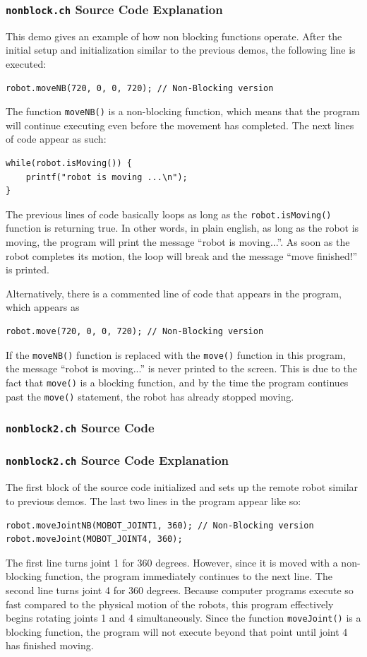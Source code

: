 \documentclass{article}
\begin{document}
\subsubsection{\texttt{nonblock.ch} Source Code Explanation}
This demo gives an example of how non blocking functions operate. 
After the initial setup and initialization similar to the previous
demos, the following line is executed:
\begin{verbatim}
robot.moveNB(720, 0, 0, 720); // Non-Blocking version
\end{verbatim}
The function \texttt{moveNB()} is a non-blocking function, which means
that the program will continue executing even before the movement
has completed. The next lines of code appear as such:
\begin{verbatim}
while(robot.isMoving()) {
    printf("robot is moving ...\n");
}
\end{verbatim}
The previous lines of code basically loops as long as the \texttt{robot.isMoving()} function
is returning true. In other words, in plain english, as long as the robot is moving,
the program will print the message ``robot is moving...''. As soon as the robot completes
its motion, the loop will break and the message ``move finished!'' is printed.

Alternatively, there is a commented line of code that appears in the program, which
appears as
\begin{verbatim}
robot.move(720, 0, 0, 720); // Non-Blocking version
\end{verbatim}
If the \texttt{moveNB()} function is replaced with the \texttt{move()} function in this program,
the message ``robot is moving...'' is never printed to the screen. This is due to the
fact that \texttt{move()} is a blocking function, and by the time the program continues past
the \texttt{move()} statement, the robot has already stopped moving.

\subsubsection{\texttt{nonblock2.ch} Source Code}

\subsubsection{\texttt{nonblock2.ch} Source Code Explanation}
The first block of the source code initialized and sets up the remote robot 
similar to previous demos. The last two lines in the program appear like so:
\begin{verbatim}
robot.moveJointNB(MOBOT_JOINT1, 360); // Non-Blocking version
robot.moveJoint(MOBOT_JOINT4, 360);
\end{verbatim}
The first line turns joint 1 for 360 degrees. However, since it is moved with a non-blocking function,
the program immediately continues to the next line. The second line turns joint 4 for
360 degrees. Because computer programs execute so fast compared to the physical
motion of the robots, this program effectively begins rotating joints 1 and 4 
simultaneously. Since the function \texttt{moveJoint()} is a blocking function,
the program will not execute beyond that point until joint 4 has finished moving.
\end{document}

